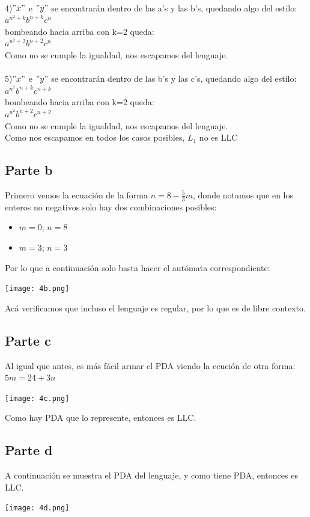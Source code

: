 \documentclass[11pt,letterpaper]{article}
\begin{document}
 \\
4)$"x"$ e $"y"$ se encontrarán dentro de las a's y las b's, quedando algo del estilo: \\
\indent $a^{n^2+k}b^{n+k}c^n$ \\
\indent bombeando hacia arriba con k=2 queda: \\
\indent $a^{n^2+2}b^{n+2}c^n$ \\
\indent Como no se cumple la igualdad, nos escapamos del lenguaje. \\
 \\
5)$"x"$ e $"y"$ se encontrarán dentro de las b's y las c's, quedando algo del estilo: \\
\indent $a^{n^2}b^{n+k}c^{n+k}$ \\
\indent bombeando hacia arriba con k=2 queda: \\
\indent $a^{n^2}b^{n+2}c^{n+2}$ \\
\indent Como no se cumple la igualdad, nos escapamos del lenguaje. \\

\noindent Como nos escapamos en todos los casos posibles, $L_{1}$ no es LLC

\subsection{Parte b}
	Primero vemos la ecuación de la forma $n = 8 - \frac{5}{3} m$, donde notamos que en los enteros no negativos solo hay dos combinaciones posibles:
	\begin{itemize}
		\item $m=0$; $n=8$
		\item $m=3$; $n=3$
	\end{itemize}
	Por lo que a continuación solo basta hacer el autómata correspondiente:
	\begin{center}
	\texttt{[image: 4b.png]}
	\end{center}
	Acá verificamos que incluso el lenguaje es regular, por lo que es de libre contexto.
\subsection{Parte c}
	Al igual que antes, es más fácil armar el PDA viendo la ecución de otra forma: $5m = 24 + 3n$
	\begin{center}
	\texttt{[image: 4c.png]}
	\end{center}
	Como hay PDA que lo represente, entonces es LLC.
\subsection{Parte d}
	A continuación se muestra el PDA del lenguaje, y como tiene PDA, entonces es LLC.
	\begin{center}
	\texttt{[image: 4d.png]}
	\end{center}
\end{document}
